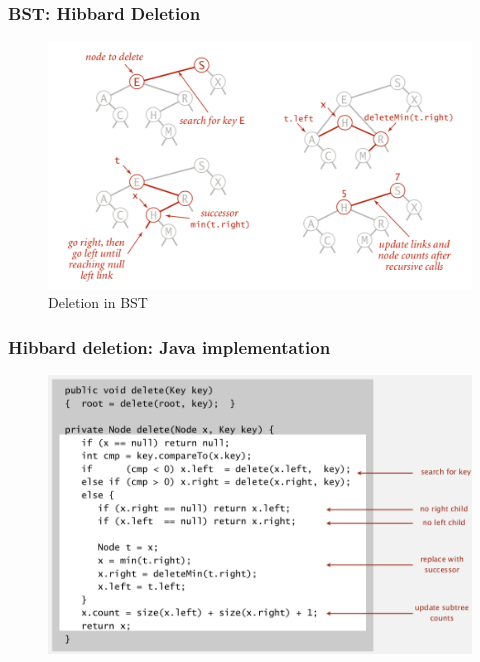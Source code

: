 \documentclass[11pt]{beamer}
\begin{document}
   \begin{frame}
  	\frametitle{BST: Hibbard Deletion} 
  	\begin{figure}
  		\centering
  		\includegraphics[width=0.9\linewidth]{"Screenshot 2020-11-16 at 11.45.48 PM"}
  		\caption{Deletion in BST}
  		\label{fig:screenshot-2020-11-16-at-11}
  	\end{figure}
  	
  \end{frame}	

  \begin{frame}
  	\frametitle{Hibbard deletion: Java implementation} 
  	\begin{figure}
  		\centering
  		\includegraphics[width=1\linewidth]{"Screenshot 2020-11-16 at 10.33.33 PM"}
  		\caption{}
  		\label{fig:screenshot-2020-11-16-at-10}
  	\end{figure}	
  \end{frame}	
\end{document}
